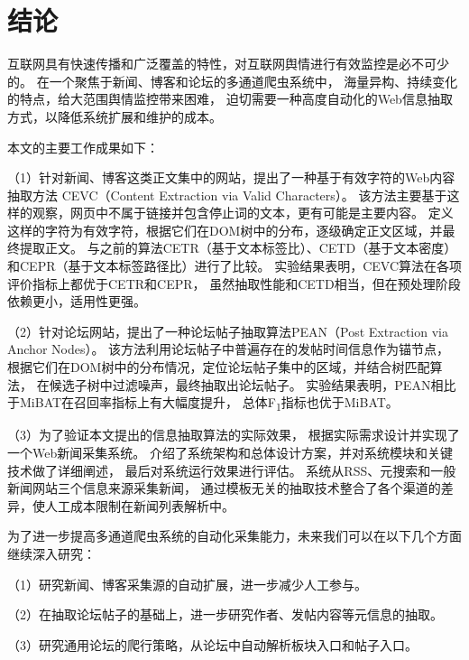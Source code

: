 
\chapter*{结\quad 论}
{}

互联网具有快速传播和广泛覆盖的特性，对互联网舆情进行有效监控是必不可少的。
在一个聚焦于新闻、博客和论坛的多通道爬虫系统中，
海量异构、持续变化的特点，给大范围舆情监控带来困难，
迫切需要一种高度自动化的Web信息抽取方式，以降低系统扩展和维护的成本。

本文的主要工作成果如下：

（1）针对新闻、博客这类正文集中的网站，提出了一种基于有效字符的Web内容抽取方法
CEVC（Content Extraction via Valid Characters）。
该方法主要基于这样的观察，网页中不属于链接并包含停止词的文本，更有可能是主要内容。
定义这样的字符为有效字符，根据它们在DOM树中的分布，逐级确定正文区域，并最终提取正文。
与之前的算法CETR（基于文本标签比）、CETD（基于文本密度）
和CEPR（基于文本标签路径比）进行了比较。
实验结果表明，CEVC算法在各项评价指标上都优于CETR和CEPR，
虽然抽取性能和CETD相当，但在预处理阶段依赖更小，适用性更强。

（2）针对论坛网站，提出了一种论坛帖子抽取算法PEAN（Post Extraction via Anchor Nodes）。
该方法利用论坛帖子中普遍存在的发帖时间信息作为锚节点，
根据它们在DOM树中的分布情况，定位论坛帖子集中的区域，并结合树匹配算法，
在候选子树中过滤噪声，最终抽取出论坛帖子。
实验结果表明，PEAN相比于MiBAT在召回率指标上有大幅度提升，
总体F\textsubscript{1}指标也优于MiBAT。

（3）为了验证本文提出的信息抽取算法的实际效果，
根据实际需求设计并实现了一个Web新闻采集系统。
介绍了系统架构和总体设计方案，并对系统模块和关键技术做了详细阐述，
最后对系统运行效果进行评估。
系统从RSS、元搜索和一般新闻网站三个信息来源采集新闻，
通过模板无关的抽取技术整合了各个渠道的差异，使人工成本限制在新闻列表解析中。

为了进一步提高多通道爬虫系统的自动化采集能力，未来我们可以在以下几个方面继续深入研究：

（1）研究新闻、博客采集源的自动扩展，进一步减少人工参与。

（2）在抽取论坛帖子的基础上，进一步研究作者、发帖内容等元信息的抽取。

（3）研究通用论坛的爬行策略，从论坛中自动解析板块入口和帖子入口。

